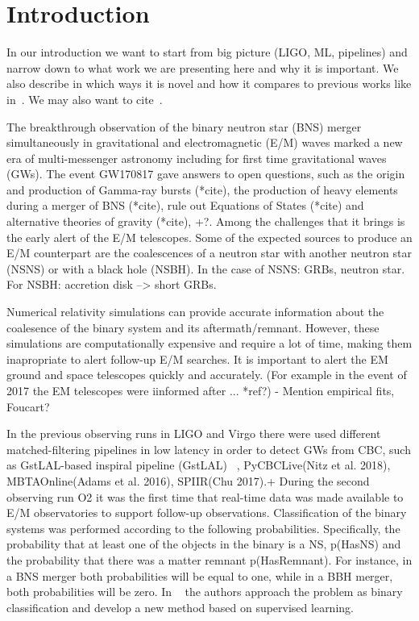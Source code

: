 \section{Introduction}
In our introduction we want to start from big picture (LIGO, ML, pipelines)
and narrow down to what work we are presenting here and why it is important. We
also describe in which ways it is novel and how it compares to previous works
like in~\cite{Chatterjee:2019avs}. We may also want to cite~\cite{Sachdev:2020lfd}. 


The breakthrough observation of the binary neutron star (BNS) merger simultaneously in gravitational and electromagnetic (E/M) waves \cite{LIGOScientific:2017ync} marked a new era of multi-messenger astronomy including for first time gravitational waves (GWs). The event GW170817 gave answers to open questions, such as the origin and production of Gamma-ray bursts (*cite), the production of heavy elements during a merger of BNS (*cite), rule out Equations of States (*cite) and alternative theories of gravity (*cite), +?. Among the challenges that it brings is the early alert of the E/M telescopes. Some of the expected sources to produce an E/M counterpart are the coalescences of a neutron star with another neutron star (NSNS) or with a black hole (NSBH). In the case of NSNS: GRBs, neutron star. For NSBH: accretion disk --> short GRBs.

Numerical relativity simulations can provide accurate information about the coalesence of the binary system and its aftermath/remnant. However, these simulations are computationally expensive and require a lot of time, making them inapropriate to alert follow-up E/M searches. It is important to alert the EM ground and space telescopes quickly and accurately. (For example in the event of 2017 the EM telescopes were iinformed after ... *ref?)
- Mention empirical fits, Foucart?

 
In the previous observing runs in LIGO and Virgo there were used different matched-filtering pipelines in low latency in order to detect GWs from CBC, such as GstLAL-based inspiral pipeline (GstLAL) ~\cite{Sachdev:2020lfd}, PyCBCLive(Nitz et al. 2018), MBTAOnline(Adams et al. 2016), SPIIR(Chu 2017).+ During the second observing run O2 it was the first time that real-time data was made available to E/M observatories to support follow-up observations. Classification of the binary systems was performed according to the following probabilities. Specifically, the probability that at least one of the objects in the binary is a NS, p(HasNS) and the probability that there was a matter remnant p(HasRemnant). For instance, in a BNS merger both probabilities will be equal to one, while in a BBH merger, both probabilities will be zero. In ~\cite{Chatterjee:2019avs} the authors approach the problem as binary classification and develop a new method based on supervised learning.




